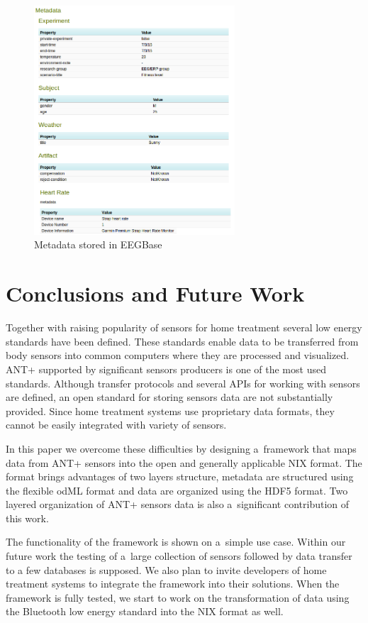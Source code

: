\documentclass[a4paper,twoside]{article}
\begin{document}
\begin{figure}
  \centering\includegraphics[width=7.5cm]{portal_example.png}
  \caption{Metadata stored in EEGBase}
  \label{fig:EEGBase}
 \end{figure}


\section{Conclusions and Future Work}\label{sec:future-work}

Together with raising popularity of sensors for home treatment several low energy standards have been defined. These standards enable data to be transferred from body sensors into common computers where they are processed and visualized. ANT+ supported by significant sensors producers is one of the most used standards. Although transfer protocols and several APIs for working with sensors are defined, an open standard for storing sensors data are not substantially provided. Since home treatment systems use proprietary data formats, they cannot be easily integrated with variety of sensors.

In this paper we overcome these difficulties by designing a~framework that maps data from ANT+ sensors into the open and generally applicable NIX format. The format brings advantages of two layers structure, metadata are structured using the flexible odML format and data are organized using the HDF5 format. Two layered organization of ANT+ sensors data is also a~significant contribution of this work.

The functionality of the framework is shown on a~simple use case. Within our future work the testing of a~large collection of sensors followed by data transfer to a few databases is supposed. We also plan to invite developers of home treatment systems to integrate the framework into their solutions. When the framework is fully tested, we start to work on the transformation of data using the Bluetooth low energy standard into the NIX format as well.
\end{document}

